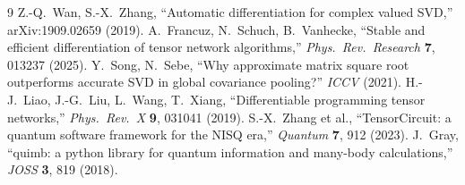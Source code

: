 \documentclass[11pt]{article}
\begin{document}
\begin{thebibliography}{9}
 Z.-Q.~Wan, S.-X.~Zhang, ``Automatic differentiation for complex valued SVD,'' arXiv:1909.02659 (2019).
 A.~Francuz, N.~Schuch, B.~Vanhecke, ``Stable and efficient differentiation of tensor network algorithms,'' \textit{Phys.\ Rev.\ Research} \textbf{7}, 013237 (2025).
 Y.~Song, N.~Sebe, ``Why approximate matrix square root outperforms accurate SVD in global covariance pooling?'' \textit{ICCV} (2021).
 H.-J.~Liao, J.-G.~Liu, L.~Wang, T.~Xiang, ``Differentiable programming tensor networks,'' \textit{Phys.\ Rev.\ X} \textbf{9}, 031041 (2019).
 S.-X.~Zhang et al., ``TensorCircuit: a quantum software framework for the NISQ era,'' \textit{Quantum} \textbf{7}, 912 (2023).
 J.~Gray, ``quimb: a python library for quantum information and many-body calculations,'' \textit{JOSS} \textbf{3}, 819 (2018).
\end{thebibliography}
\end{document}

